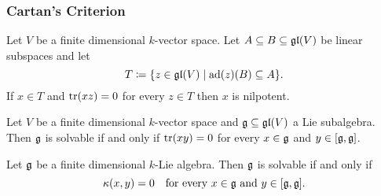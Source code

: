 \subsubsection{Cartan’s Criterion}


\begin{lem}
 Let $V$ be a finite dimensional $k$-vector space. Let $A \subseteq B \subseteq \mathfrak{gl}(V)$ be linear subspaces and let
 \[
  T \coloneqq \{z \in \mathfrak{gl}(V) \mid \operatorname{ad}(z)(B) \subseteq A\}.
 \]
 If $x \in T$ and $\operatorname{tr}(xz) = 0$ for every $z \in T$ then $x$ is nilpotent.
\end{lem}


\begin{lem}
 Let $V$ be a finite dimensional $k$-vector space and $\mathfrak{g} \subseteq \mathfrak{gl}(V)$ a Lie subalgebra. Then $\mathfrak{g}$ is solvable if and only if $\operatorname{tr}(xy) = 0$ for every $x \in \mathfrak{g}$ and $y \in [\mathfrak{g},\mathfrak{g}]$.
\end{lem}


\begin{thrm}
 Let $\mathfrak{g}$ be a finite dimensional $k$-Lie algebra. Then $\mathfrak{g}$ is solvable if and only if
 \[
  \kappa(x,y) = 0 \quad \text{for every $x \in \mathfrak{g}$ and $y \in [\mathfrak{g},\mathfrak{g}]$}.
 \]
\end{thrm}













